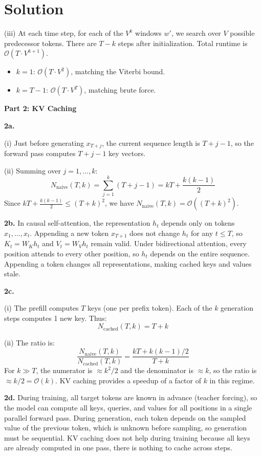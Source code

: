 \documentclass[submit]{../harvardml}
\newenvironment{solution}
  {\color{blue}\section*{Solution}}
{}
\begin{document}
\begin{solution}
(iii) At each time step, for each of the $V^k$ windows $w'$, we search over $V$ possible predecessor tokens. There are $T - k$ steps after initialization. Total runtime is $\mathcal{O}(T \cdot V^{k+1})$.
\begin{itemize}
  \item $k=1$: $\mathcal{O}(T \cdot V^2)$, matching the Viterbi bound.
  \item $k=T-1$: $\mathcal{O}(T \cdot V^T)$, matching brute force.
\end{itemize}

\bigskip
\textbf{Part 2: KV Caching}

\textbf{2a.}

(i) Just before generating $x_{T+j}$, the current sequence length is $T + j - 1$, so the forward pass computes $T + j - 1$ key vectors.

(ii) Summing over $j = 1, \ldots, k$:
\[
N_{\text{naive}}(T,k) = \sum_{j=1}^{k} (T + j - 1) = kT + \frac{k(k-1)}{2}
\]
Since $kT + \frac{k(k-1)}{2} \le (T+k)^2$, we have $N_{\text{naive}}(T,k) = \mathcal{O}((T+k)^2)$.

\textbf{2b.} In causal self-attention, the representation $h_t$ depends only on tokens $x_1, \ldots, x_t$. Appending a new token $x_{T+1}$ does not change $h_t$ for any $t \le T$, so $K_t = W_K h_t$ and $V_t = W_V h_t$ remain valid. Under bidirectional attention, every position attends to every other position, so $h_t$ depends on the entire sequence. Appending a token changes all representations, making cached keys and values stale.

\textbf{2c.}

(i) The prefill computes $T$ keys (one per prefix token). Each of the $k$ generation steps computes 1 new key. Thus:
\[
N_{\text{cached}}(T,k) = T + k
\]

(ii) The ratio is:
\[
\frac{N_{\text{naive}}(T,k)}{N_{\text{cached}}(T,k)} = \frac{kT + k(k-1)/2}{T + k}
\]
For $k \gg T$, the numerator is $\approx k^2/2$ and the denominator is $\approx k$, so the ratio is $\approx k/2 = \mathcal{O}(k)$. KV caching provides a speedup of a factor of $k$ in this regime.

\textbf{2d.} During training, all target tokens are known in advance (teacher forcing), so the model can compute all keys, queries, and values for all positions in a single parallel forward pass. During generation, each token depends on the sampled value of the previous token, which is unknown before sampling, so generation must be sequential. KV caching does not help during training because all keys are already computed in one pass, there is nothing to cache across steps.


\end{solution}
\end{document}
